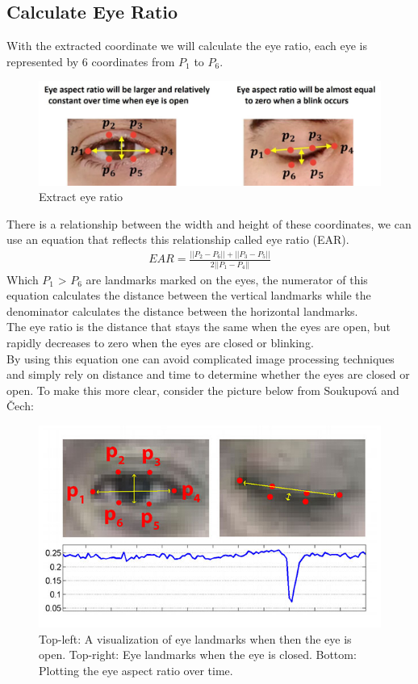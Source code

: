     \subsection{Calculate Eye Ratio}
        With the extracted coordinate we will calculate the eye ratio, each eye is represented by 6 coordinates from $P_1$ to $P_6$.
        \begin{figure}[H]
            \centering
            \includegraphics[width=0.6\linewidth]{img/eye-ratio.jpg}
            \caption{Extract eye ratio}
        \end{figure}
        There is a relationship between the width and height of these coordinates, we can use an equation that reflects this relationship called eye ratio (EAR).
        \begin{align}
            EAR = \frac{||P_2 - P_6|| + ||P_3 - P_5||}{2||P_1 - P_4||}
        \end{align}
        Which $P_1$ > $P_6$ are landmarks marked on the eyes, the numerator of this equation calculates the distance between the vertical landmarks 
        while the denominator calculates the distance between the horizontal landmarks. \\ 
        \vspace{3mm}
        The eye ratio is the distance that stays the same when the eyes are open, but rapidly decreases to zero when the eyes are closed or blinking. \\ 
        \vspace{3mm}
        By using this equation one can avoid complicated image processing techniques and simply rely on distance and time to determine whether the eyes are closed 
        or open. To make this more clear, consider the picture below from Soukupová and Čech:
        \begin{figure}[H]
            \centering
            \includegraphics[width=0.6\linewidth]{img/calculate.png}
            \caption{Top-left: A visualization of eye landmarks when then the eye is open. Top-right: Eye landmarks when the eye is closed. Bottom: Plotting the eye aspect ratio over time.}
        \end{figure}

